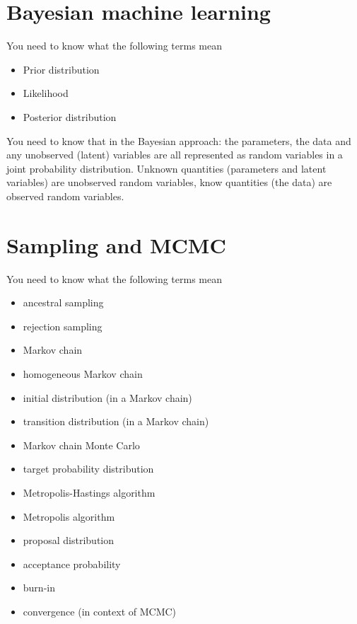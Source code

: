\documentclass{article}
\newcommand{\yntk}{You need to know}
\begin{document}
\section{Bayesian machine learning}
\label{sec:bayesian}

\yntk{} what the following terms mean
\begin{itemize}
\item Prior distribution
\item Likelihood
\item Posterior distribution
\end{itemize}

\yntk{} that in the Bayesian approach: the parameters, the data and
any unobserved (latent) variables are all represented as random
variables in a joint probability distribution. Unknown quantities
(parameters and latent variables) are unobserved random variables,
know quantities (the data) are observed random variables.

\section{Sampling and MCMC}
\label{sec:mcmc}

\yntk{} what the following terms mean
\begin{itemize}
\item ancestral sampling
\item rejection sampling
\item Markov chain
\item homogeneous Markov chain
\item initial distribution (in a Markov chain)
\item transition distribution (in a Markov chain)
\item Markov chain Monte Carlo
\item target probability distribution
\item Metropolis-Hastings algorithm
\item Metropolis algorithm
\item proposal distribution
\item acceptance probability
\item burn-in
\item convergence (in context of MCMC)
\end{itemize}
\end{document}
